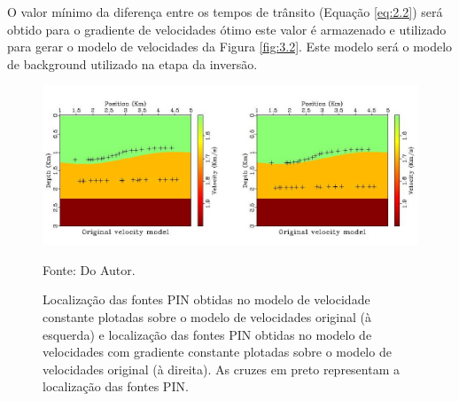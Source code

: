 O valor mínimo da diferença entre os tempos de trânsito (Equação \ref{eq:2.2}) será obtido para o gradiente de velocidades ótimo este valor é armazenado e utilizado para gerar o modelo de velocidades
da Figura \ref{fig:3.2}. Este modelo será o modelo de background utilizado na etapa da inversão.

\begin{figure}[H]
\caption{Localização das fontes PIN obtidas no modelo de velocidade constante
plotadas sobre o modelo de velocidades original (à esquerda)
e localização das fontes PIN obtidas no modelo de velocidades com gradiente constante
plotadas sobre o modelo de velocidades original (à direita).
As cruzes em preto representam a localização das fontes PIN.}
\begin{center}
\includegraphics[scale=2]{images/resultinv.jpeg}
\vspace{-0.3cm}
\end{center}
\begin{center}
 Fonte: Do Autor.
\end{center}
\label{fig:3.4}
\end{figure}
